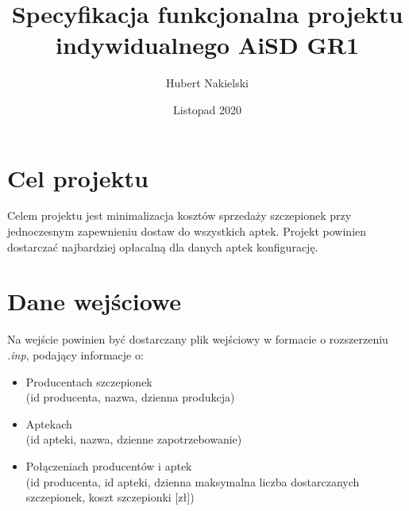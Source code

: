 \documentclass[]{article}
\title{Specyfikacja funkcjonalna projektu indywidualnego \textbf{AiSD GR1}}
\author{Hubert Nakielski}
\date{Listopad 2020}
\begin{document}
\maketitle

\section{Cel projektu}
Celem projektu jest minimalizacja kosztów sprzedaży szczepionek przy jednoczesnym
 zapewnieniu dostaw do wszystkich aptek. Projekt powinien dostarczać najbardziej opłacalną 
 dla danych aptek konfigurację.
 
\section{Dane wejściowe}
Na wejście powinien być dostarczany plik wejściowy w formacie o rozszerzeniu \textit{.inp}, podający informacje o: \\
\begin{itemize}


\item
Producentach szczepionek \\
(id producenta, nazwa, dzienna produkcja)\\
\item
Aptekach\\ (id apteki, nazwa, dzienne zapotrzebowanie)\\
\item
Połączeniach producentów i aptek \\(id producenta, id apteki, dzienna maksymalna liczba dostarczanych szczepionek, koszt 
szczepionki [zł])

\end{itemize}


\begin{table}[h!]
\caption{Producenci }
\end{table}
\end{document}
